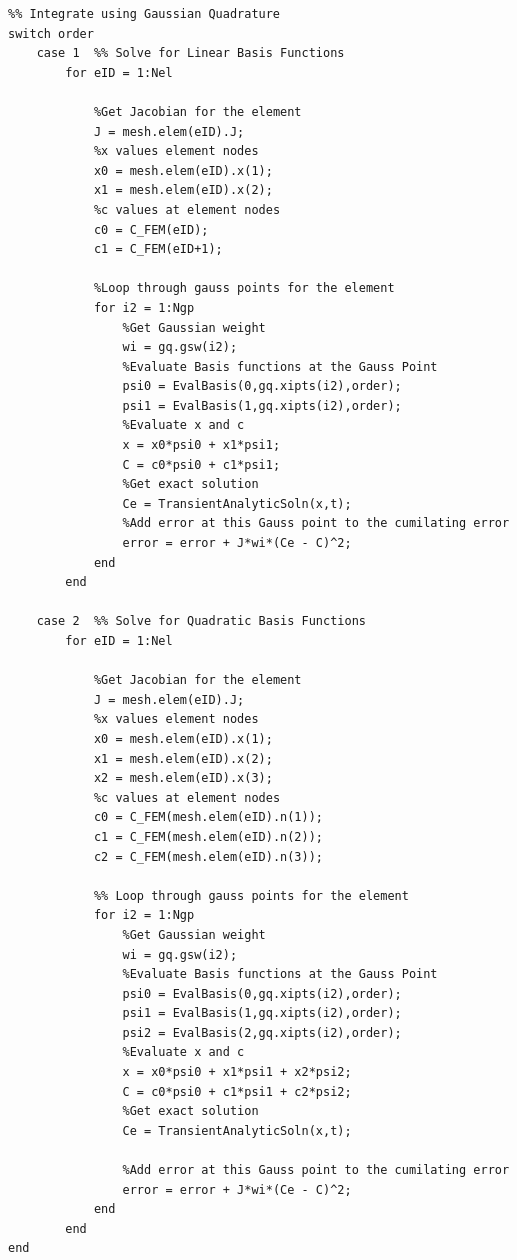\documentclass[11pt]{article}
\begin{document}
\begin{appendices}
\begin{lstlisting}
%% Integrate using Gaussian Quadrature
switch order
    case 1  %% Solve for Linear Basis Functions
        for eID = 1:Nel
            
            %Get Jacobian for the element
            J = mesh.elem(eID).J;
            %x values element nodes
            x0 = mesh.elem(eID).x(1);
            x1 = mesh.elem(eID).x(2);
            %c values at element nodes
            c0 = C_FEM(eID); 
            c1 = C_FEM(eID+1); 
            
            %Loop through gauss points for the element
            for i2 = 1:Ngp
                %Get Gaussian weight
                wi = gq.gsw(i2);
                %Evaluate Basis functions at the Gauss Point
                psi0 = EvalBasis(0,gq.xipts(i2),order);
                psi1 = EvalBasis(1,gq.xipts(i2),order);
                %Evaluate x and c
                x = x0*psi0 + x1*psi1;
                C = c0*psi0 + c1*psi1;
                %Get exact solution
                Ce = TransientAnalyticSoln(x,t);
                %Add error at this Gauss point to the cumilating error
                error = error + J*wi*(Ce - C)^2;
            end
        end
        
    case 2  %% Solve for Quadratic Basis Functions
        for eID = 1:Nel
            
            %Get Jacobian for the element
            J = mesh.elem(eID).J;
            %x values element nodes
            x0 = mesh.elem(eID).x(1);
            x1 = mesh.elem(eID).x(2);
            x2 = mesh.elem(eID).x(3);
            %c values at element nodes
            c0 = C_FEM(mesh.elem(eID).n(1)); 
            c1 = C_FEM(mesh.elem(eID).n(2));
            c2 = C_FEM(mesh.elem(eID).n(3));
            
            %% Loop through gauss points for the element
            for i2 = 1:Ngp
                %Get Gaussian weight
                wi = gq.gsw(i2);
                %Evaluate Basis functions at the Gauss Point
                psi0 = EvalBasis(0,gq.xipts(i2),order);
                psi1 = EvalBasis(1,gq.xipts(i2),order);
                psi2 = EvalBasis(2,gq.xipts(i2),order);
                %Evaluate x and c
                x = x0*psi0 + x1*psi1 + x2*psi2;
                C = c0*psi0 + c1*psi1 + c2*psi2;
                %Get exact solution
                Ce = TransientAnalyticSoln(x,t);
                
                %Add error at this Gauss point to the cumilating error
                error = error + J*wi*(Ce - C)^2;
            end
        end
end


\end{lstlisting}
\end{appendices}
\end{document}
